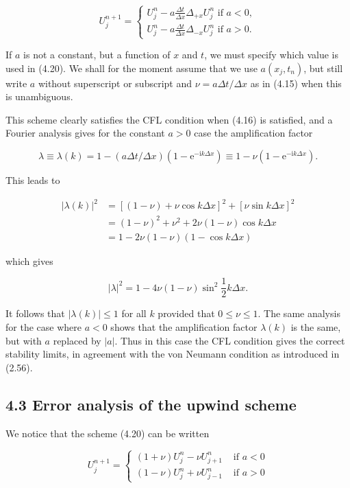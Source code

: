 \documentclass[10pt]{article}
\begin{document}
\[
U_{j}^{n+1}=\left\{\begin{array}{l}
U_{j}^{n}-a \frac{\Delta t}{\Delta x} \Delta_{+x} U_{j}^{n} \text { if } a<0, \\
U_{j}^{n}-a \frac{\Delta t}{\Delta x} \Delta_{-x} U_{j}^{n} \text { if } a>0 .
\end{array}\right.
\]

If \(a\) is not a constant, but a function of \(x\) and \(t\), we must specify which value is used in (4.20). We shall for the moment assume that we use \(a\left(x_{j}, t_{n}\right)\), but still write \(a\) without superscript or subscript and \(\nu= a \Delta t / \Delta x\) as in (4.15) when this is unambiguous.

This scheme clearly satisfies the CFL condition when (4.16) is satisfied, and a Fourier analysis gives for the constant \(a>0\) case the amplification factor

\[
\lambda \equiv \lambda(k)=1-(a \Delta t / \Delta x)\left(1-\mathrm{e}^{-\mathrm{i} k \Delta x}\right) \equiv 1-\nu\left(1-\mathrm{e}^{-\mathrm{i} k \Delta x}\right) .
\]

This leads to

\[
\begin{aligned}
|\lambda(k)|^{2} & =[(1-\nu)+\nu \cos k \Delta x]^{2}+[\nu \sin k \Delta x]^{2} \\
& =(1-\nu)^{2}+\nu^{2}+2 \nu(1-\nu) \cos k \Delta x \\
& =1-2 \nu(1-\nu)(1-\cos k \Delta x)
\end{aligned}
\]

which gives

\[
|\lambda|^{2}=1-4 \nu(1-\nu) \sin ^{2} \frac{1}{2} k \Delta x .
\]

It follows that \(|\lambda(k)| \leq 1\) for all \(k\) provided that \(0 \leq \nu \leq 1\). The same analysis for the case where \(a<0\) shows that the amplification factor \(\lambda(k)\) is the same, but with \(a\) replaced by \(|a|\). Thus in this case the CFL condition gives the correct stability limits, in agreement with the von Neumann condition as introduced in (2.56).

\subsection*{4.3 Error analysis of the upwind scheme}
We notice that the scheme (4.20) can be written

\[
U_{j}^{n+1}= \begin{cases}(1+\nu) U_{j}^{n}-\nu U_{j+1}^{n} & \text { if } a<0 \\ (1-\nu) U_{j}^{n}+\nu U_{j-1}^{n} & \text { if } a>0\end{cases}
\]
\end{document}
